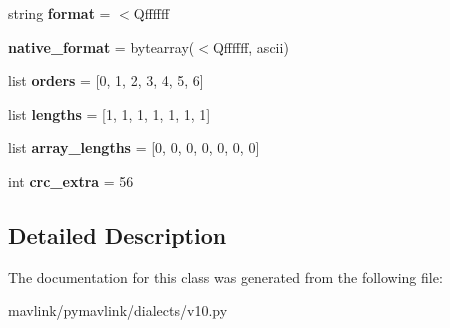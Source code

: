 \begin{DoxyCompactItemize}
string {\bfseries format} = \textquotesingle{}$<$Qffffff\textquotesingle{}
\item 
\mbox{\label{classpymavlink_1_1dialects_1_1v10_1_1MAVLink__vicon__position__estimate__message_ac8fba9eefdf8e2bebb1fd37877a5915f}} 
{\bfseries native\+\_\+format} = bytearray(\textquotesingle{}$<$Qffffff\textquotesingle{}, \textquotesingle{}ascii\textquotesingle{})
\item 
\mbox{\label{classpymavlink_1_1dialects_1_1v10_1_1MAVLink__vicon__position__estimate__message_aa57604b1dd34c8c74a49657e0d01c408}} 
list {\bfseries orders} = \mbox{[}0, 1, 2, 3, 4, 5, 6\mbox{]}
\item 
\mbox{\label{classpymavlink_1_1dialects_1_1v10_1_1MAVLink__vicon__position__estimate__message_a7a09d875b11ff60414d2448a34a8be98}} 
list {\bfseries lengths} = \mbox{[}1, 1, 1, 1, 1, 1, 1\mbox{]}
\item 
\mbox{\label{classpymavlink_1_1dialects_1_1v10_1_1MAVLink__vicon__position__estimate__message_a2c62e48367f4039f9d80aadbab5eec01}} 
list {\bfseries array\+\_\+lengths} = \mbox{[}0, 0, 0, 0, 0, 0, 0\mbox{]}
\item 
\mbox{\label{classpymavlink_1_1dialects_1_1v10_1_1MAVLink__vicon__position__estimate__message_af0aa350e61b86a90fc1a487f3a36ca60}} 
int {\bfseries crc\+\_\+extra} = 56
\end{DoxyCompactItemize}


\subsection{Detailed Description}
\begin{DoxyVerb}\end{DoxyVerb}
 

The documentation for this class was generated from the following file\+:\begin{DoxyCompactItemize}
\item 
mavlink/pymavlink/dialects/v10.\+py\end{DoxyCompactItemize}
